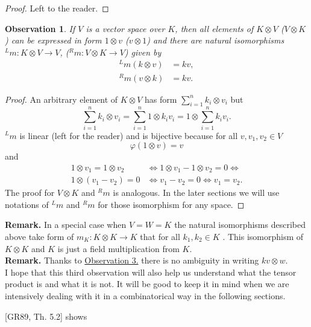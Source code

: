 \documentclass[a4paper]{article}
\newtheorem{observation}{Observation}
\begin{document}
\begin{proof}
Left to the reader.
\end{proof}
\begin{observation}\label{observation:5}
If $V$ is a vector space over $K$, then all elements of $K \otimes V$ ($V \otimes K$) can be expressed in
form $1 \otimes v$ ($v \otimes 1$) and there are natural isomorphisms ${^Lm} : K \otimes V \to V$,
(${^Rm} : V \otimes K \to V$) given by
\begin{align*}
{^Lm}(k \otimes v) &= kv, \\
{^Rm}(v \otimes k) &= kv.
\end{align*}
\end{observation}
\begin{proof}
An arbitrary element of $K \otimes V$ has form $\displaystyle\sum^n_{i=1}k_i \otimes v_i$ but
\begin{equation*}
\sum^n_{i=1}k_i \otimes v_i = \sum^n_{i=1} 1 \otimes k_iv_i = 1 \otimes \sum^n_{i=1}k_iv_i.
\end{equation*}
${^Lm}$ is linear (left for the reader) and is bijective because for all $v, v_1, v_2 \in V$
\begin{equation*}
\varphi(1 \otimes v) = v
\end{equation*}
and
\begin{align*}
1 \otimes v_1 = 1 \otimes v_2 &\iff 1 \otimes v_1 - 1 \otimes v_2 = 0 \iff \\
1 \otimes (v_1 - v_2) = 0 &\iff v_1 -v_2 = 0 \iff v_1 = v_2.
\end{align*}
The proof for $V \otimes K$ and ${^Rm}$ is analogous. In the later sections we will use notations of
${^Lm}$ and ${^Rm}$ for those isomorphism for any space.
\end{proof}
\textbf{Remark. } In a special case when $V = W = K$ the natural isomorphisms described above
take form of $m_K : K \otimes K \to K$ that for all $k_1, k_2\in K$
. This isomorphism of $K \otimes K$ and $K$ is just a field
multiplication from $K$. \\[8pt]
\noindent \textbf{Remark. } Thanks to \hyperref[observation:3]{Observation 3.} there is no ambiguity in
writing
$kv \otimes w$. \\
I hope that this third observation will also help us understand what the tensor product is and what it is
 not.
It will be good to keep it in mind when we are intensively dealing with it in a combinatorical way in
the following sections.

[GR89, Th. 5.2] \label{basis}shows
\end{document}
